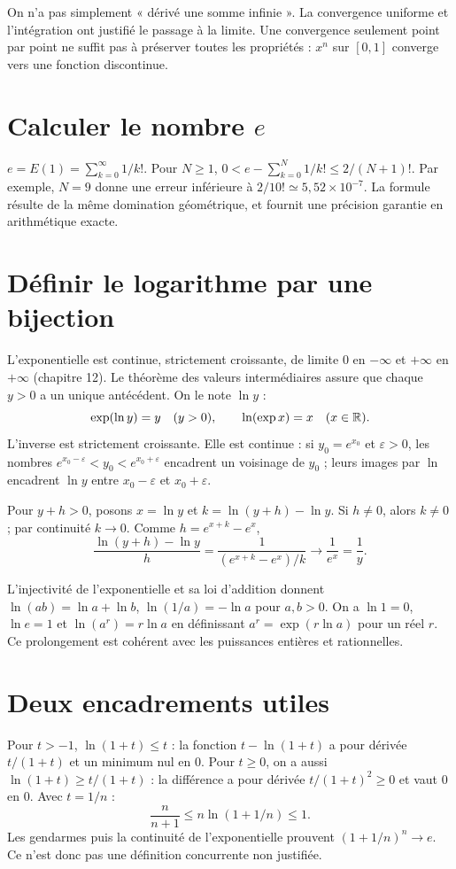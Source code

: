 \documentclass[../cours_1re.tex]{subfiles}
\begin{document}
\begin{attention}
On n'a pas simplement « dérivé une somme infinie ».
La convergence uniforme et l'intégration ont justifié le passage à la limite.
Une convergence seulement point par point ne suffit pas à préserver toutes
les propriétés : $x^n$ sur $[0,1]$ converge vers une fonction discontinue.
\end{attention}

\section{Calculer le nombre \texorpdfstring{$e$}{e}}
$e=E(1)=\sum_{k=0}^\infty1/k!$.
Pour $N\ge1$,
$0<e-\sum_{k=0}^N1/k!\le2/(N+1)!$.
Par exemple, $N=9$ donne une erreur inférieure à
$2/10!\simeq5{,}52\times10^{-7}$.
La formule résulte de la même domination géométrique, et fournit
une précision garantie en arithmétique exacte.

\section{Définir le logarithme par une bijection}
L'exponentielle est continue, strictement croissante, de limite $0$
en $-\infty$ et $+\infty$ en $+\infty$ (chapitre 12).
Le théorème des valeurs intermédiaires assure que chaque $y>0$
a un unique antécédent. On le note $\ln y$ :
\[
\exp(\ln y)=y\quad(y>0),\qquad \ln(\exp x)=x\quad(x\in\mathbb{R}).
\]
L'inverse est strictement croissante. Elle est continue :
si $y_0=e^{x_0}$ et $\varepsilon>0$, les nombres
$e^{x_0-\varepsilon}<y_0<e^{x_0+\varepsilon}$ encadrent un voisinage
de $y_0$ ; leurs images par $\ln$ encadrent $\ln y$ entre
$x_0-\varepsilon$ et $x_0+\varepsilon$.

\begin{demonstration}
Pour $y+h>0$, posons $x=\ln y$ et $k=\ln(y+h)-\ln y$.
Si $h\ne0$, alors $k\ne0$ ; par continuité $k\to0$.
Comme $h=e^{x+k}-e^x$,
\[
\frac{\ln(y+h)-\ln y}{h}
=\frac1{(e^{x+k}-e^x)/k}\longrightarrow\frac1{e^x}=\frac1y.
\]
\end{demonstration}
L'injectivité de l'exponentielle et sa loi d'addition donnent
$\ln(ab)=\ln a+\ln b$, $\ln(1/a)=-\ln a$ pour $a,b>0$.
On a $\ln1=0$, $\ln e=1$ et $\ln(a^r)=r\ln a$ en définissant
$a^r=\exp(r\ln a)$ pour un réel $r$.
Ce prolongement est cohérent avec les puissances entières et rationnelles.

\section{Deux encadrements utiles}
Pour $t>-1$, $\ln(1+t)\le t$ : la fonction
$t-\ln(1+t)$ a pour dérivée $t/(1+t)$ et un minimum nul en $0$.
Pour $t\ge0$, on a aussi $\ln(1+t)\ge t/(1+t)$ :
la différence a pour dérivée $t/(1+t)^2\ge0$ et vaut $0$ en $0$.
Avec $t=1/n$ :
\[
\frac{n}{n+1}\le n\ln(1+1/n)\le1.
\]
Les gendarmes puis la continuité de l'exponentielle prouvent
$(1+1/n)^n\to e$. Ce n'est donc pas une définition concurrente non justifiée.
\end{document}
